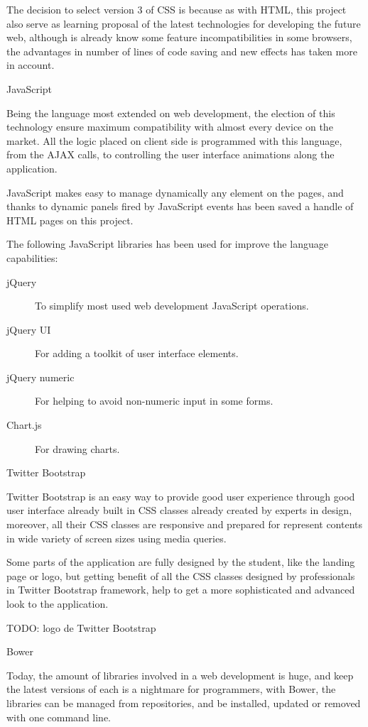 \documentclass{DeustoFDP}
\begin{document}
The decision to select version 3 of CSS is because as with HTML, this project also serve as learning proposal of the latest technologies for developing the future web, although is already know some feature incompatibilities in some browsers, the advantages in number of lines of code saving and new effects has taken more in account.

{\large JavaScript}

Being the language most extended on web development, the election of this technology ensure maximum compatibility with almost every device on the market. All the logic placed on client side is programmed with this language, from the AJAX calls, to controlling the user interface animations along the application.

JavaScript makes easy to manage dynamically any element on the pages, and thanks to dynamic panels fired by JavaScript events has been saved a handle of HTML pages on this project.

The following JavaScript libraries has been used for improve the language capabilities:
\begin{description}
	\item[jQuery] To simplify most used web development JavaScript operations.
	\item[jQuery UI] For adding a toolkit of user interface elements.
	\item[jQuery numeric] For helping to avoid non-numeric input in some forms.
	\item[Chart.js] For drawing charts.
\end{description}

{\large Twitter Bootstrap}

Twitter Bootstrap is an easy way to provide good user experience through good user interface already built in CSS classes already created by experts in design, moreover, all their CSS classes are responsive and prepared for represent contents in wide variety of screen sizes using media queries.

Some parts of the application are fully designed by the student, like the landing page or logo, but getting benefit of all the CSS classes designed by professionals in Twitter Bootstrap framework, help to get a more sophisticated and advanced look to the application.

TODO: logo de Twitter Bootstrap   

{\large Bower}

Today, the amount of libraries involved in a web development is huge, and keep the latest versions of each is a nightmare for programmers, with Bower, the libraries can be managed from repositories, and be installed, updated or removed with one command line.
\end{document}
